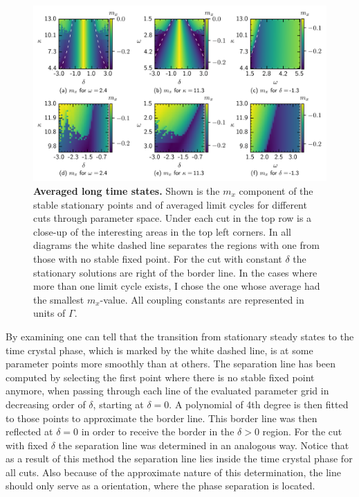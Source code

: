 \begin{figure}[H]
    \hspace*{-1.2cm}
    \includegraphics[scale=1]{pictures/stable_fixp_extended_withline_dashed.png}
    \caption{\textbf{Averaged long time states.} Shown is the $m_x$ component of the stable stationary points and of averaged limit cycles for different cuts through parameter space. Under each cut in the top row is a close-up of the interesting areas in the top left corners. In all diagrams the white dashed line separates the regions with one from those with no stable fixed point. For the cut with constant $\delta$ the stationary solutions are right of the border line. In the cases where more than one limit cycle exists, I chose the one whose average had the smallest $m_x$-value. All coupling constants are represented in units of $\Gamma$.}
    \label{fig:fixedpoint_colormap}
\end{figure}
By examining  one can tell that the transition from stationary steady states to the time crystal phase, which is marked by the white dashed line, is at some parameter points more smoothly than at others. The separation line has been computed by selecting the first point where there is no stable fixed point anymore, when passing through each line of the evaluated parameter grid in decreasing order of $\delta$, starting at $\delta=0$. A polynomial of 4th degree is then fitted to those points to approximate the border line. This border line was then reflected at $\delta=0$ in order to receive the border in the $\delta>0$ region. For the cut with fixed $\delta$ the separation line was determined in an analogous way. Notice that as a result of this method the separation line lies inside the time crystal phase for all cuts. Also because of the approximate nature of this determination, the line should only serve as a orientation, where the phase separation is located.

